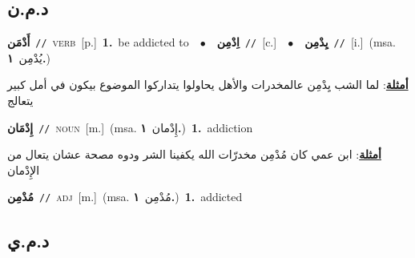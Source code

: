 \documentclass[10pt,a4paper,twoside]{article} %
\begin{document}
\begin{multicols}{2}
\vspace{-3mm}
\subsection*{\color{blue}\foreignlanguage{arabic}{د.م.ن}\color{blue}{}} 

{\setlength\topsep{0pt}\textbf{\foreignlanguage{arabic}{أَدْمَن}}\ {\color{gray}\texttt{//}\color{black}}\ \textsc{verb}\ [p.]\ \textbf{1.}~be addicted to\ \ $\bullet$\ \ \setlength\topsep{0pt}\textbf{\foreignlanguage{arabic}{اِدْمِن}}\ {\color{gray}\texttt{//}\color{black}}\ [c.]\ \ $\bullet$\ \ \setlength\topsep{0pt}\textbf{\foreignlanguage{arabic}{يِدْمِن}}\ {\color{gray}\texttt{//}\color{black}}\ [i.]\ \color{gray}(msa. \foreignlanguage{arabic}{يُدْمِن}~\foreignlanguage{arabic}{\textbf{١.}})\color{black}\  \begin{flushright}\color{gray}\foreignlanguage{arabic}{\textbf{\underline{\foreignlanguage{arabic}{أمثلة}}}: لما الشب يِدْمِن عالمخدرات والأهل يحاولوا يتداركوا الموضوع بيكون في أمل كبير يتعالج}\end{flushright}\color{black}} \vspace{2mm}

{\setlength\topsep{0pt}\textbf{\foreignlanguage{arabic}{إِدْمَان}}\ {\color{gray}\texttt{//}\color{black}}\ \textsc{noun}\ [m.]\ \color{gray}(msa. \foreignlanguage{arabic}{إِدْمان}~\foreignlanguage{arabic}{\textbf{١.}})\color{black}\ \textbf{1.}~addiction\  \begin{flushright}\color{gray}\foreignlanguage{arabic}{\textbf{\underline{\foreignlanguage{arabic}{أمثلة}}}: ابن عمي كان مُدْمِن مخدرّات الله يكفينا الشر ودوه مصحة عشان يتعال من الإِدْمان}\end{flushright}\color{black}} \vspace{2mm}

{\setlength\topsep{0pt}\textbf{\foreignlanguage{arabic}{مُدْمِن}}\ {\color{gray}\texttt{//}\color{black}}\ \textsc{adj}\ [m.]\ \color{gray}(msa. \foreignlanguage{arabic}{مُدْمِن}~\foreignlanguage{arabic}{\textbf{١.}})\color{black}\ \textbf{1.}~addicted\ } \vspace{2mm}

\vspace{-3mm}
\subsection*{\color{blue}\foreignlanguage{arabic}{د.م.ي}\color{blue}{}} 


\end{multicols}
\end{document}
